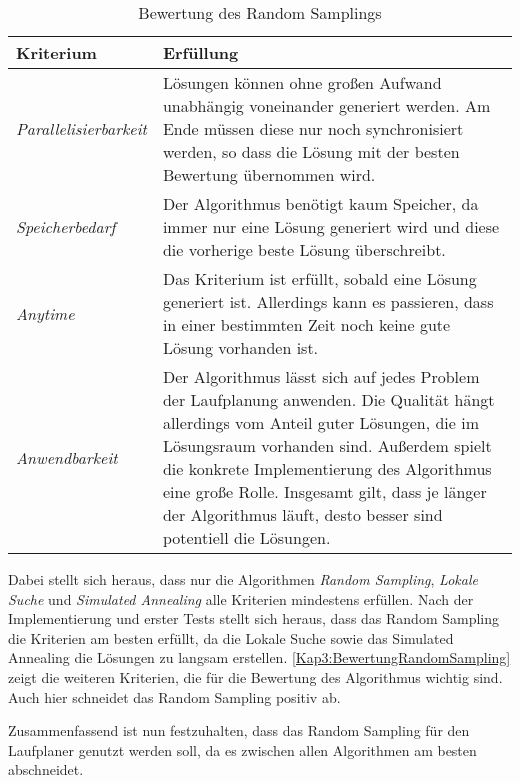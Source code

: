 \begin{table}[!t]
  \caption{Bewertung des Random Samplings}
  \label{Kap3:BewertungRandomSampling}
  \renewcommand{\arraystretch}{1.2}
  \centering
  \sffamily
  \begin{footnotesize}
    \begin{tabularx}{0.9\textwidth}{l X}
      \toprule
      \textbf{Kriterium} & \textbf{Erfüllung}\\
      \midrule
      \emph{Parallelisierbarkeit} & Lösungen können ohne großen Aufwand unabhängig voneinander generiert werden. Am Ende müssen diese nur noch synchronisiert werden, so dass die Lösung mit der besten Bewertung übernommen wird.\\
      \addlinespace
      \emph{Speicherbedarf} & Der Algorithmus benötigt kaum Speicher, da immer nur eine Lösung generiert wird und diese die vorherige beste Lösung überschreibt.\\
      \addlinespace
      \emph{Anytime} & Das Kriterium ist erfüllt, sobald eine Lösung generiert ist. Allerdings kann es passieren, dass in einer bestimmten Zeit noch keine gute Lösung vorhanden ist.\\
      \addlinespace
      \emph{Anwendbarkeit} & Der Algorithmus lässt sich auf jedes Problem der Laufplanung anwenden. Die Qualität hängt allerdings vom Anteil guter Lösungen, die im Lösungsraum vorhanden sind. Außerdem spielt die konkrete Implementierung des Algorithmus eine große Rolle. Insgesamt gilt, dass je länger der Algorithmus läuft, desto besser sind potentiell die Lösungen.\\
      \bottomrule
    \end{tabularx}
  \end{footnotesize}
  \rmfamily
\end{table}

Dabei stellt sich heraus, dass nur die Algorithmen \emph{Random Sampling}, \emph{Lokale Suche} und \emph{Simulated Annealing} alle Kriterien mindestens erfüllen. Nach der Implementierung und erster Tests stellt sich heraus, dass das Random Sampling die Kriterien am besten erfüllt, da die Lokale Suche sowie das Simulated Annealing die Lösungen zu langsam erstellen. \autoref{Kap3:BewertungRandomSampling} zeigt die weiteren Kriterien, die für die Bewertung des Algorithmus wichtig sind. Auch hier schneidet das Random Sampling positiv ab.

Zusammenfassend ist nun festzuhalten, dass das Random Sampling für den Laufplaner genutzt werden soll, da es zwischen allen Algorithmen am besten abschneidet.

